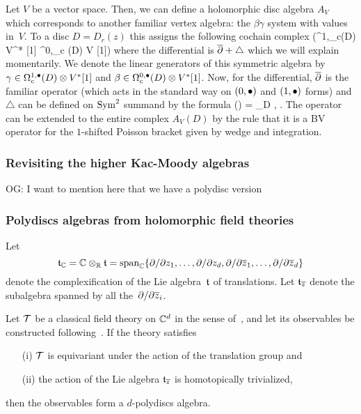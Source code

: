 \documentclass[11pt]{amsart}
\def\owen#1{{\textcolor{violet!65!black}{OG: {#1}}}}
\begin{document}
Let $V$ be a vector space.
Then, we can define a holomorphic disc algebra $A_V$ which corresponds to another familiar vertex algebra: the $\beta\gamma$ system with values in~$V$.
To a disc $D = D_r(z)$ this assigns the following cochain complex
\beqn
\Sym \left(\Omega^{1,\bu}_c(D) \otimes V^* [1] \oplus \Omega^{0,\bu}_c (D) \otimes V [1]\right) 
\eeqn
where the differential is ${\overline{\partial}} + \triangle$ which we will explain momentarily. 
We denote the linear generators of this symmetric algebra by $\gamma \in \Omega^{1,\bullet}_c(D) \otimes V^* [1]$ and $\beta \in \Omega^{0,\bullet}_c(D) \otimes V^* [1]$.
Now, for the differential, ${\overline{\partial}}$ is the familiar operator (which acts in the standard way on $(0,\bullet)$ and $(1,\bullet)$ forms) and $\triangle$ can be defined on $\operatorname{Sym}^2$ summand by the formula
\beqn
\triangle (\gamma \cdot \beta) = \int_D \<\gamma, \beta\> . 
\eeqn
The operator can be extended to the entire complex $A_V(D)$ by the rule that it is a BV operator for the $1$-shifted Poisson bracket given by wedge and integration.

\subsubsection{Revisiting the higher Kac-Moody algebras}

\owen{I want to mention here that we have a polydisc version}

\subsubsection{Polydiscs algebras from holomorphic field theories}

Let 
\[
\mathfrak t_\mathbb C = \mathbb C \otimes_\mathbb R \mathfrak t = \text{span}_{\mathbb C}\{\partial/\partial z_1, \ldots, \partial/\partial z_d, \partial/\partial {\overline{z}}_1, \ldots, \partial/\partial {\overline{z}}_d  \}
\]
denote the complexification of the Lie algebra~$\mathfrak t$ of translations.
Let $\mathfrak t_{{\overline{z}}}$ denote the subalgebra spanned by all the~$\partial/\partial {\overline{z}}_i$.

\begin{thm}[\cite{CG1},\owen{precise location}]
Let $\mathcal T$ be a classical field theory on $\mathbb C^d$ in the sense of~\cite{CosBook},
and let its observables be constructed following~\cite{CG2}.
If the theory satisfies 
\begin{enumerate}
\item[(i)] $\mathcal T$ is equivariant under the action of the translation group and
\item[(ii)] the action of the Lie algebra $\mathfrak t_{{\overline{z}}}$ is homotopically trivialized,
\end{enumerate}
then the observables form a $d$-polydiscs algebra.
\end{thm}
\end{document}
